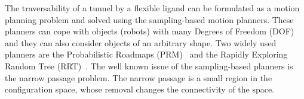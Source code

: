 \documentclass[usletter, 10pt, conference]{ieeeconf} %
\def\qrand{q_{rand}}
\def\qnear{q_{near}}
\def\qnew{q_{new}}
\def\T{\mathcal{T}}
\def\C{\mathcal{C}}
\begin{document}


The traversability of a tunnel by a flexible ligand can be formulated as a motion planning problem and solved using the sampling-based motion planners.
These planners can cope with objects (robots) with many Degrees of Freedom (DOF) and they can also consider objects of an arbitrary shape.
Two widely used planners are the Probabilistic Roadmaps (PRM)~\cite{kavrakiForPP} and the Rapidly Exploring Random Tree (RRT)~\cite{lavalleRRT}.
The well known issue of the sampling-based planners is the narrow passage problem.
The narrow passage is a small region in the configuration space, whose removal changes the connectivity of the space.
\end{document}
